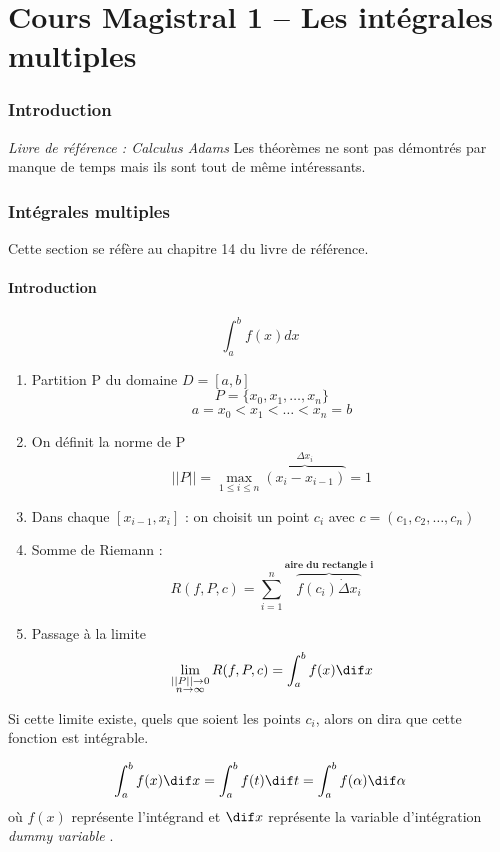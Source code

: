 \part{Cours Magistral 1 -- Les intégrales multiples}
\section*{Introduction}
\emph{Livre de référence : Calculus Adams}
Les théorèmes ne sont pas démontrés par manque de temps mais ils sont tout de même intéressants.
\section{Intégrales multiples}

Cette section se réfère au chapitre 14 du livre de référence.
\subsection{Introduction}
\[\int_{a}^{b} {f(x) dx}\]


\begin{enumerate}

\item Partition P du domaine $D=[a,b]$
$$ P = \{x_0,x_1,\dots,x_n\}$$
$$a=x_0<x_1<\dots<x_n=b$$
\item On définit la norme de P
$$||P|| = \underset{1\le i \le n}{\max} \overbrace{(x_i-x_{i-1})}^{\Delta x_i}=1$$

\item Dans chaque $[{x_{i-1},x_i}]$ : on choisit un point $c_i$ avec $c=(c_1,c_2,\dots,c_n)$

\item  Somme de Riemann : $$R(f,P,c)=\sum_{i=1}^{n} \overbrace{f(c_i)\dot \Delta  x_i}^{\textbf{aire du rectangle i}} $$

\item Passage à la limite $$\lim\limits_{\substack{||P|| \to 0 \\ n \to \infty}} R(f,P,c) =\int_{a}^{b} {f(x) \dif x}$$

\end{enumerate}
Si cette limite existe, quels que soient les points $c_i$, alors on dira que cette fonction est intégrable.
\begin{myrem}
$$\int_{a}^{b} {f(x) \dif x} = \int_{a}^{b} {f(t) \dif t} = \int_{a}^{b} {f(\alpha) \dif \alpha}$$ où $f(x)$ représente l'intégrand et $\dif x$ représente la variable d'intégration \textit{\og dummy variable \fg{}}.
\end{myrem}


